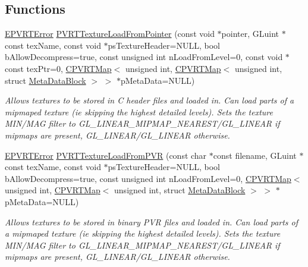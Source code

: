 \subsection*{Functions}
\begin{DoxyCompactItemize}
\item 
\hyperlink{_p_v_r_t_error_8h_a9e837ff1a83f3a5f332bc4cc78454608}{E\+P\+V\+R\+T\+Error} \hyperlink{group___a_p_i___o_g_l_e_s3_ga49dc74480ad4ec5a2f393f641117d54f}{P\+V\+R\+T\+Texture\+Load\+From\+Pointer} (const void $\ast$pointer, G\+Luint $\ast$const tex\+Name, const void $\ast$ps\+Texture\+Header=N\+U\+L\+L, bool b\+Allow\+Decompress=true, const unsigned int n\+Load\+From\+Level=0, const void $\ast$const tex\+Ptr=0, \hyperlink{singleton_c_p_v_r_t_map}{C\+P\+V\+R\+T\+Map}$<$ unsigned int, \hyperlink{singleton_c_p_v_r_t_map}{C\+P\+V\+R\+T\+Map}$<$ unsigned int, struct \hyperlink{struct_meta_data_block}{Meta\+Data\+Block} $>$ $>$ $\ast$p\+Meta\+Data=N\+U\+L\+L)
\begin{DoxyCompactList}\small\item\em Allows textures to be stored in C header files and loaded in. Can load parts of a mipmaped texture (ie skipping the highest detailed levels). Sets the texture M\+I\+N/\+M\+A\+G filter to G\+L\+\_\+\+L\+I\+N\+E\+A\+R\+\_\+\+M\+I\+P\+M\+A\+P\+\_\+\+N\+E\+A\+R\+E\+S\+T/\+G\+L\+\_\+\+L\+I\+N\+E\+A\+R if mipmaps are present, G\+L\+\_\+\+L\+I\+N\+E\+A\+R/\+G\+L\+\_\+\+L\+I\+N\+E\+A\+R otherwise. \end{DoxyCompactList}\item 
\hyperlink{_p_v_r_t_error_8h_a9e837ff1a83f3a5f332bc4cc78454608}{E\+P\+V\+R\+T\+Error} \hyperlink{group___a_p_i___o_g_l_e_s3_ga6eecac4c871ba7ccdd0ef4b057a7d596}{P\+V\+R\+T\+Texture\+Load\+From\+P\+V\+R} (const char $\ast$const filename, G\+Luint $\ast$const tex\+Name, const void $\ast$ps\+Texture\+Header=N\+U\+L\+L, bool b\+Allow\+Decompress=true, const unsigned int n\+Load\+From\+Level=0, \hyperlink{singleton_c_p_v_r_t_map}{C\+P\+V\+R\+T\+Map}$<$ unsigned int, \hyperlink{singleton_c_p_v_r_t_map}{C\+P\+V\+R\+T\+Map}$<$ unsigned int, struct \hyperlink{struct_meta_data_block}{Meta\+Data\+Block} $>$ $>$ $\ast$p\+Meta\+Data=N\+U\+L\+L)
\begin{DoxyCompactList}\small\item\em Allows textures to be stored in binary P\+V\+R files and loaded in. Can load parts of a mipmaped texture (ie skipping the highest detailed levels). Sets the texture M\+I\+N/\+M\+A\+G filter to G\+L\+\_\+\+L\+I\+N\+E\+A\+R\+\_\+\+M\+I\+P\+M\+A\+P\+\_\+\+N\+E\+A\+R\+E\+S\+T/\+G\+L\+\_\+\+L\+I\+N\+E\+A\+R if mipmaps are present, G\+L\+\_\+\+L\+I\+N\+E\+A\+R/\+G\+L\+\_\+\+L\+I\+N\+E\+A\+R otherwise. \end{DoxyCompactList}\end{DoxyCompactItemize}


